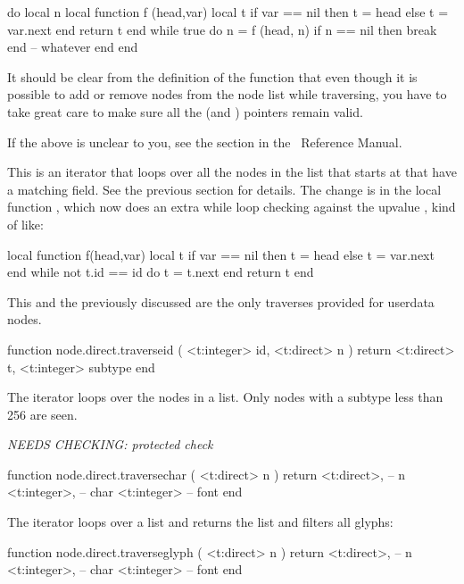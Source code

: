 \starttyping[option=LUA]
do
    local n
    local function f (head,var)
        local t
        if var == nil then
            t = head
        else
            t = var.next
        end
        return t
    end
    while true do
        n = f (head, n)
        if n == nil then
            break
        end
        -- whatever
    end
end
\stoptyping

It should be clear from the definition of the function  that even though
it is possible to add or remove nodes from the node list while traversing, you
have to take great care to make sure all the  (and )
pointers remain valid.

If the above is unclear to you, see the section  in the
\LUA\ Reference Manual.

This is an iterator that loops over all the nodes in the list that starts at
 that have a matching  field. See the previous section for
details. The change is in the local function , which now does an extra
while loop checking against the upvalue , kind of like:

\starttyping
local function f(head,var)
    local t
    if var == nil then
        t = head
    else
        t = var.next
    end
    while not t.id == id do
        t = t.next
    end
    return t
end
\stoptyping

This and the previously discussed  are the only traverses
provided for userdata nodes.

\starttyping[option=LUA]
function node.direct.traverseid ( <t:integer> id, <t:direct> n )
    return
        <t:direct>  t,
        <t:integer> subtype
end
\stoptyping

The  iterator loops over the  nodes in a list.
Only nodes with a subtype less than 256 are seen.

{\em NEEDS CHECKING: protected check}

\starttyping[option=LUA]
function node.direct.traversechar ( <t:direct> n )
    return
        <t:direct>,  -- n
        <t:integer>, -- char
        <t:integer>  -- font
end
\stoptyping

The  iterator loops over a list and returns the list and
filters all glyphs:

\starttyping[option=LUA]
function node.direct.traverseglyph ( <t:direct> n )
    return
        <t:direct>,  -- n
        <t:integer>, -- char
        <t:integer>  -- font
end
\stoptyping

